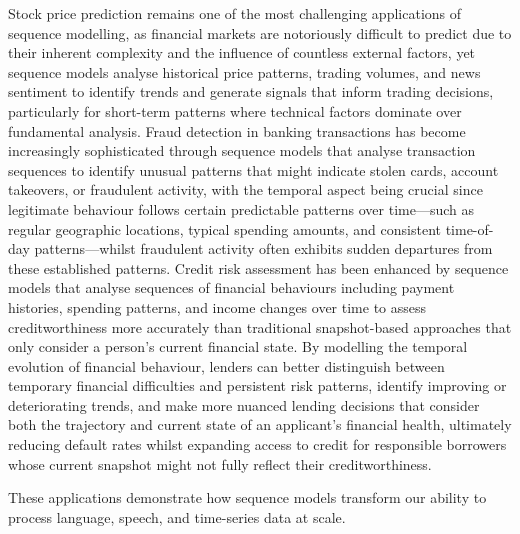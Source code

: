 Stock price prediction remains one of the most challenging applications of sequence modelling, as financial markets are notoriously difficult to predict due to their inherent complexity and the influence of countless external factors, yet sequence models analyse historical price patterns, trading volumes, and news sentiment to identify trends and generate signals that inform trading decisions, particularly for short-term patterns where technical factors dominate over fundamental analysis. Fraud detection in banking transactions has become increasingly sophisticated through sequence models that analyse transaction sequences to identify unusual patterns that might indicate stolen cards, account takeovers, or fraudulent activity, with the temporal aspect being crucial since legitimate behaviour follows certain predictable patterns over time—such as regular geographic locations, typical spending amounts, and consistent time-of-day patterns—whilst fraudulent activity often exhibits sudden departures from these established patterns. Credit risk assessment has been enhanced by sequence models that analyse sequences of financial behaviours including payment histories, spending patterns, and income changes over time to assess creditworthiness more accurately than traditional snapshot-based approaches that only consider a person's current financial state. By modelling the temporal evolution of financial behaviour, lenders can better distinguish between temporary financial difficulties and persistent risk patterns, identify improving or deteriorating trends, and make more nuanced lending decisions that consider both the trajectory and current state of an applicant's financial health, ultimately reducing default rates whilst expanding access to credit for responsible borrowers whose current snapshot might not fully reflect their creditworthiness.

These applications demonstrate how sequence models transform our ability to process language, speech, and time-series data at scale.

